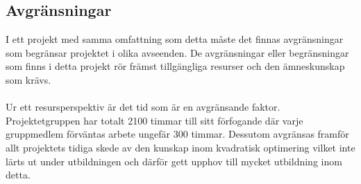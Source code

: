 \subsection{Avgränsningar}
I ett projekt med samma omfattning som detta måste det finnas avgränsningar som begränsar projektet i olika avseenden. De avgränsningar eller begränsningar som finns i detta projekt rör främst tillgängliga resurser och den ämneskunskap som krävs.
\\ \\
Ur ett resursperspektiv är det tid som är en avgränsande faktor. Projektetgruppen har totalt 2100 timmar till sitt förfogande där varje gruppmedlem förväntas arbete ungefär 300 timmar. Dessutom avgränsas framför allt projektets tidiga skede av den kunskap inom kvadratisk optimering vilket inte lärts ut under utbildningen och därför gett upphov till mycket utbildning inom detta.